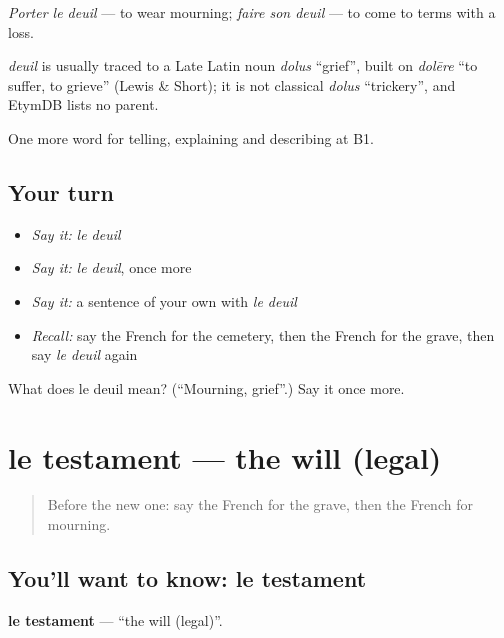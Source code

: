 \emph{Porter le deuil} — to wear mourning; \emph{faire son deuil} — to come to terms with a loss.

\begin{cousinweb}
\emph{deuil} is usually traced to a Late Latin noun \emph{dolus} \textquotedblleft{}grief\textquotedblright{}, built on \emph{dolēre} \textquotedblleft{}to suffer, to grieve\textquotedblright{} (Lewis \& Short); it is not classical \emph{dolus} \textquotedblleft{}trickery\textquotedblright{}, and EtymDB lists no parent.
\end{cousinweb}

\begin{grammarlens}[title={What you've built}]
One more word for telling, explaining and describing at B1.
\end{grammarlens}

\subsection*{Your turn}
\begin{itemize}
\raggedright
  \item \emph{Say it:} \emph{le deuil}
  \item \emph{Say it:} \emph{le deuil}, once more
  \item \emph{Say it:} a sentence of your own with \emph{le deuil}
  \item \emph{Recall:} say the French for the cemetery, then the French for the grave, then say \emph{le deuil} again
\end{itemize}

\begin{tcolorbox}[breakable,colback=teal!4,colframe=teal!35!black,title={Before you move on}]
What does le deuil mean? (\textquotedblleft{}Mourning, grief\textquotedblright{}.) Say it once more.
\end{tcolorbox}
\section[le testament]{le testament — the will (legal)}

\label{lesson:FR-C315-testament}



\begin{quote}
Before the new one: say the French for the grave, then the French for mourning.
\end{quote}

\subsection*{You'll want to know: le testament}
\textbf{le testament} — \textquotedblleft{}the will (legal)\textquotedblright{}.

